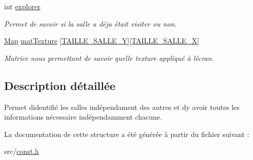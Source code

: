 \begin{DoxyCompactItemize}
int \hyperlink{structs__salle_a14caa8d9cb661d72256f0e832879ab01}{explorer}
\begin{DoxyCompactList}\small\item\em Permet de savoir si la salle a déja était visiter ou non. \end{DoxyCompactList}\item 
\mbox{\label{structs__salle_a8b8fa8779c1ea6878598d2353e41bd7f}} 
\hyperlink{structMap}{Map} \hyperlink{structs__salle_a8b8fa8779c1ea6878598d2353e41bd7f}{mat\+Texture} \mbox{[}\hyperlink{const_8h_aef95feca591fc0fcfffb4eb5c46ffbf7}{T\+A\+I\+L\+L\+E\+\_\+\+S\+A\+L\+L\+E\+\_\+Y}\mbox{]}\mbox{[}\hyperlink{const_8h_a608fae13cb35fc3e5844976e383e885a}{T\+A\+I\+L\+L\+E\+\_\+\+S\+A\+L\+L\+E\+\_\+X}\mbox{]}
\begin{DoxyCompactList}\small\item\em Matrice nous permettant de savoir quelle texture appliqué à l\textquotesingle{}écran. \end{DoxyCompactList}\end{DoxyCompactItemize}


\subsection{Description détaillée}
Permet d\textquotesingle{}identifié les salles indépendament des autres et d\textquotesingle{}y avoir toutes les informations nécessaire indépendamment chacune. 

La documentation de cette structure a été générée à partir du fichier suivant \+:\begin{DoxyCompactItemize}
\item 
src/\hyperlink{const_8h}{const.\+h}\end{DoxyCompactItemize}
